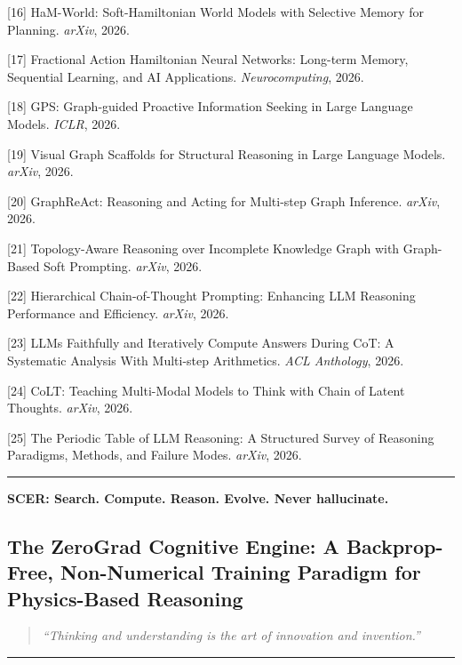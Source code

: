 \documentclass[
  11pt,
  a4paper,
]{article}
\begin{document}
{[}16{]} HaM-World: Soft-Hamiltonian World Models with Selective Memory
for Planning. \emph{arXiv}, 2026.

{[}17{]} Fractional Action Hamiltonian Neural Networks: Long-term
Memory, Sequential Learning, and AI Applications. \emph{Neurocomputing},
2026.

{[}18{]} GPS: Graph-guided Proactive Information Seeking in Large
Language Models. \emph{ICLR}, 2026.

{[}19{]} Visual Graph Scaffolds for Structural Reasoning in Large
Language Models. \emph{arXiv}, 2026.

{[}20{]} GraphReAct: Reasoning and Acting for Multi-step Graph
Inference. \emph{arXiv}, 2026.

{[}21{]} Topology-Aware Reasoning over Incomplete Knowledge Graph with
Graph-Based Soft Prompting. \emph{arXiv}, 2026.

{[}22{]} Hierarchical Chain-of-Thought Prompting: Enhancing LLM
Reasoning Performance and Efficiency. \emph{arXiv}, 2026.

{[}23{]} LLMs Faithfully and Iteratively Compute Answers During CoT: A
Systematic Analysis With Multi-step Arithmetics. \emph{ACL Anthology},
2026.

{[}24{]} CoLT: Teaching Multi-Modal Models to Think with Chain of Latent
Thoughts. \emph{arXiv}, 2026.

{[}25{]} The Periodic Table of LLM Reasoning: A Structured Survey of
Reasoning Paradigms, Methods, and Failure Modes. \emph{arXiv}, 2026.

\begin{center}\rule{0.5\linewidth}{0.5pt}\end{center}

\textbf{SCER: Search. Compute. Reason. Evolve. Never hallucinate.}

\newpage

\subsection{The ZeroGrad Cognitive Engine: A Backprop-Free,
Non-Numerical Training Paradigm for Physics-Based
Reasoning}\label{the-zerograd-cognitive-engine-a-backprop-free-non-numerical-training-paradigm-for-physics-based-reasoning}

\begin{quote}
\emph{``Thinking and understanding is the art of innovation and
invention.''}
\end{quote}

\begin{center}\rule{0.5\linewidth}{0.5pt}\end{center}
\end{document}
